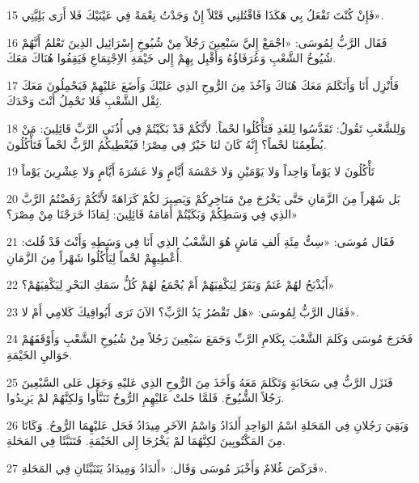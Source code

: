 \par 15 فَإِنْ كُنْتَ تَفْعَلُ بِي هَكَذَا فَاقْتُلنِي قَتْلاً إِنْ وَجَدْتُ نِعْمَةً فِي عَيْنَيْكَ فَلا أَرَى بَلِيَّتِي».
\par 16 فَقَال الرَّبُّ لِمُوسَى: «اجْمَعْ إِليَّ سَبْعِينَ رَجُلاً مِنْ شُيُوخِ إِسْرَائِيل الذِينَ تَعْلمُ أَنَّهُمْ شُيُوخُ الشَّعْبِ وَعُرَفَاؤُهُ وَأَقْبِل بِهِمْ إِلى خَيْمَةِ الاِجْتِمَاعِ فَيَقِفُوا هُنَاكَ مَعَكَ.
\par 17 فَأَنْزِل أَنَا وَأَتَكَلمَ مَعَكَ هُنَاكَ وَآخُذَ مِنَ الرُّوحِ الذِي عَليْكَ وَأَضَعَ عَليْهِمْ فَيَحْمِلُونَ مَعَكَ ثِقْل الشَّعْبِ فَلا تَحْمِلُ أَنْتَ وَحْدَكَ.
\par 18 وَلِلشَّعْبِ تَقُولُ: تَقَدَّسُوا لِلغَدِ فَتَأْكُلُوا لحْماً. لأَنَّكُمْ قَدْ بَكَيْتُمْ فِي أُذُنَيِ الرَّبِّ قَائِلِينَ: مَنْ يُطْعِمُنَا لحْماً؟ إِنَّهُ كَانَ لنَا خَيْرٌ فِي مِصْرَ! فَيُعْطِيكُمُ الرَّبُّ لحْماً فَتَأْكُلُونَ.
\par 19 تَأْكُلُونَ لا يَوْماً وَاحِداً وَلا يَوْمَيْنِ وَلا خَمْسَةَ أَيَّامٍ وَلا عَشَرَةَ أَيَّامٍ وَلا عِشْرِينَ يَوْماً
\par 20 بَل شَهْراً مِنَ الزَّمَانِ حَتَّى يَخْرُجَ مِنْ مَنَاخِرِكُمْ وَيَصِيرَ لكُمْ كَرَاهَةً لأَنَّكُمْ رَفَضْتُمُ الرَّبَّ الذِي فِي وَسَطِكُمْ وَبَكَيْتُمْ أَمَامَهُ قَائِلِينَ: لِمَاذَا خَرَجْنَا مِنْ مِصْرَ؟»
\par 21 فَقَال مُوسَى: «سِتُّ مِئَةِ أَلفِ مَاشٍ هُوَ الشَّعْبُ الذِي أَنَا فِي وَسَطِهِ وَأَنْتَ قَدْ قُلتَ: أُعْطِيهِمْ لحْماً لِيَأْكُلُوا شَهْراً مِنَ الزَّمَانِ.
\par 22 أَيُذْبَحُ لهُمْ غَنَمٌ وَبَقَرٌ لِيَكْفِيَهُمْ أَمْ يُجْمَعُ لهُمْ كُلُّ سَمَكِ البَحْرِ لِيَكْفِيَهُمْ؟»
\par 23 فَقَال الرَّبُّ لِمُوسَى: «هَل تَقْصُرُ يَدُ الرَّبِّ؟ الآنَ تَرَى أَيُوافِيكَ كَلامِي أَمْ لا».
\par 24 فَخَرَجَ مُوسَى وَكَلمَ الشَّعْبَ بِكَلامِ الرَّبِّ وَجَمَعَ سَبْعِينَ رَجُلاً مِنْ شُيُوخِ الشَّعْبِ وَأَوْقَفَهُمْ حَوَاليِ الخَيْمَةِ.
\par 25 فَنَزَل الرَّبُّ فِي سَحَابَةٍ وَتَكَلمَ مَعَهُ وَأَخَذَ مِنَ الرُّوحِ الذِي عَليْهِ وَجَعَل عَلى السَّبْعِينَ رَجُلاً الشُّيُوخَ. فَلمَّا حَلتْ عَليْهِمِ الرُّوحُ تَنَبَّأُوا وَلكِنَّهُمْ لمْ يَزِيدُوا.
\par 26 وَبَقِيَ رَجُلانِ فِي المَحَلةِ اسْمُ الوَاحِدِ أَلدَادُ وَاسْمُ الآخَرِ مِيدَادُ فَحَل عَليْهِمَا الرُّوحُ. وَكَانَا مِنَ المَكْتُوبِينَ لكِنَّهُمَا لمْ يَخْرُجَا إِلى الخَيْمَةِ. فَتَنَبَّئَا فِي المَحَلةِ.
\par 27 فَرَكَضَ غُلامٌ وَأَخْبَرَ مُوسَى وَقَال: «أَلدَادُ وَمِيدَادُ يَتَنَبَّئَانِ فِي المَحَلةِ».
